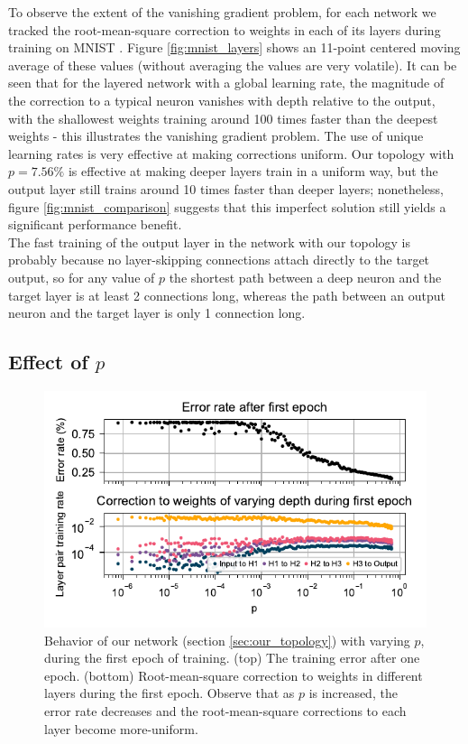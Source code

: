 \documentclass[format=sigconf]{acmart}
\newcommand{\npar}{\\\indent}
\begin{document}
To observe the extent of the vanishing gradient problem, for each network we tracked the root-mean-square correction to weights in each of its layers during training on MNIST \cite{mnist1998}. Figure \ref{fig:mnist_layers} shows an 11-point centered moving average of these values (without averaging the values are very volatile). It can be seen that for the layered network with a global learning rate, the magnitude of the correction to a typical neuron vanishes with depth relative to the output, with the shallowest weights training around 100 times faster than the deepest weights - this illustrates the vanishing gradient problem. The use of unique learning rates is very effective at making corrections uniform. Our topology with $p=7.56\%$ is effective at making deeper layers train in a uniform way, but the output layer still trains around 10 times faster than deeper layers; nonetheless, figure \ref{fig:mnist_comparison} suggests that this imperfect solution still yields a significant performance benefit.
\npar
The fast training of the output layer in the network with our topology is probably because no layer-skipping connections attach directly to the target output, so for any value of $p$ the shortest path between a deep neuron and the target layer is at least 2 connections long, whereas the path between an output neuron and the target layer is only 1 connection long.

\subsection{Effect of $p$}
\label{sec:mnist_1epoch}

\begin{figure}
  \centering
  \includegraphics[width=\columnwidth]{figures/MNIST_one_epoch_performance.pdf}
  \caption{Behavior of our network (section \ref{sec:our_topology}) with varying $p$, during the first epoch of training. (top) The training error after one epoch. (bottom) Root-mean-square correction to weights in different layers during the first epoch. Observe that as $p$ is increased, the error rate decreases and the root-mean-square corrections to each layer become more-uniform.}
  \label{fig:mnist_1epoch}
\end{figure}
\end{document}
